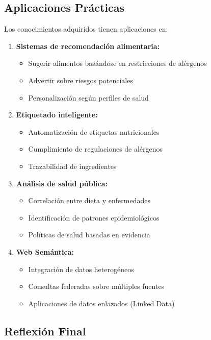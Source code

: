 \documentclass[12pt,a4paper]{article}
\begin{document}
\subsection{Aplicaciones Prácticas}

Los conocimientos adquiridos tienen aplicaciones en:

\begin{enumerate}
    \item \textbf{Sistemas de recomendación alimentaria:}
    \begin{itemize}
        \item Sugerir alimentos basándose en restricciones de alérgenos
        \item Advertir sobre riesgos potenciales
        \item Personalización según perfiles de salud
    \end{itemize}
    
    \item \textbf{Etiquetado inteligente:}
    \begin{itemize}
        \item Automatización de etiquetas nutricionales
        \item Cumplimiento de regulaciones de alérgenos
        \item Trazabilidad de ingredientes
    \end{itemize}
    
    \item \textbf{Análisis de salud pública:}
    \begin{itemize}
        \item Correlación entre dieta y enfermedades
        \item Identificación de patrones epidemiológicos
        \item Políticas de salud basadas en evidencia
    \end{itemize}
    
    \item \textbf{Web Semántica:}
    \begin{itemize}
        \item Integración de datos heterogéneos
        \item Consultas federadas sobre múltiples fuentes
        \item Aplicaciones de datos enlazados (Linked Data)
    \end{itemize}
\end{enumerate}

\subsection{Reflexión Final}
\end{document}
